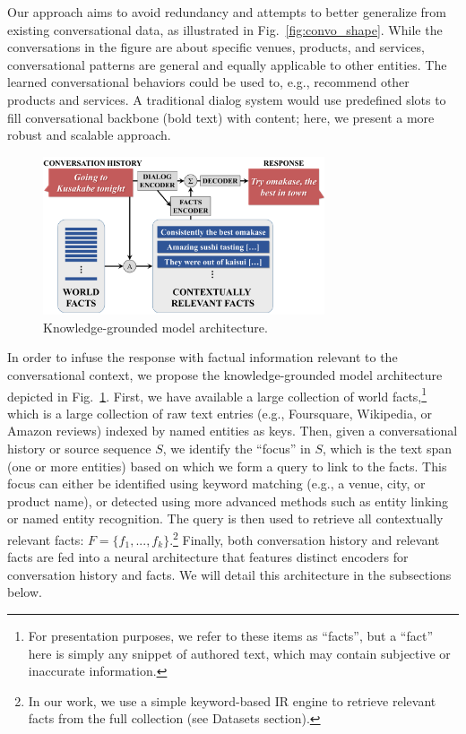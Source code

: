\documentclass[letterpaper]{article}
\begin{document}
Our approach aims to avoid redundancy and attempts to better generalize from existing conversational data, as illustrated in Fig.~\ref{fig:convo_shape}.
While the conversations in the figure are about specific venues, products, and services, conversational patterns are general and equally applicable to other entities.
The learned conversational behaviors could be used to, e.g., recommend other products and services.
A traditional dialog system would use predefined slots to fill conversational backbone (bold text) with content; here, we present a more robust and scalable approach.

\begin{figure}
\centering
\includegraphics[width=8.3cm]{facts-emb}
\caption{Knowledge-grounded model architecture.}
\label{fig:arch}
\end{figure}

In order to infuse the response with factual information relevant to the conversational context, we propose the knowledge-grounded model architecture
depicted in Fig.~\ref{fig:arch}.
First, we have available a large collection of world facts,\footnote{For presentation purposes, we refer to these items as ``facts'', but a ``fact'' here is simply any snippet of authored text, which may contain subjective or inaccurate information.} which is a large collection of raw text entries (e.g., Foursquare, Wikipedia, or Amazon reviews) indexed by named entities as keys.
Then, given a conversational history or source sequence $S$, we identify the ``focus'' in $S$, which is the text span (one or more entities) based on which we form a query to link to the facts.
This focus can either be identified using keyword matching (e.g., a venue, city, or product name), or detected using more advanced methods such as entity linking or named entity recognition.
The query
is then used to retrieve all contextually relevant facts: \mbox{$F=\{f_1,...,f_{k}\}$}.\footnote{In our work, we use a simple keyword-based IR engine to retrieve relevant facts from the full collection (see Datasets section).}
Finally, both conversation history and relevant facts are fed into a neural architecture
that features distinct encoders for conversation history and facts. We will detail this architecture in the subsections below.
\end{document}
